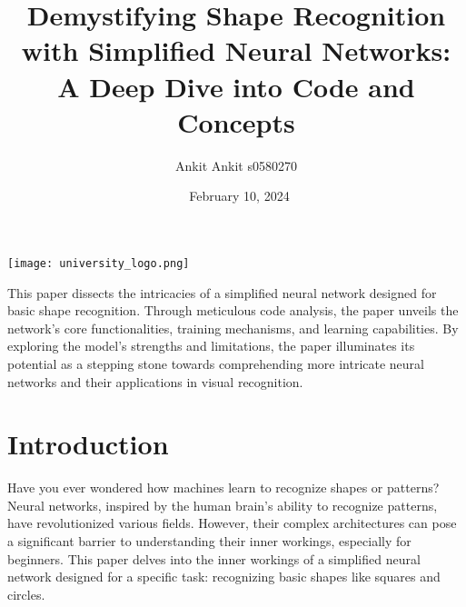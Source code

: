 \documentclass{article}
\renewenvironment{abstract}
 {\small\quotation\noindent\ignorespaces}
 {\endquotation}
\begin{document}
\begin{titlepage}
  \centering
 \vspace*{\fill}
  \texttt{[image: university\_logo.png]}  
 \vspace*{\fill}
  \title{Demystifying Shape Recognition with Simplified Neural Networks: A Deep Dive into Code and Concepts}
  \author{Ankit Ankit s0580270}
  \date{\ February 10, 2024 }
  \maketitle

\begin{abstract}
This paper dissects the intricacies of a simplified neural network designed for basic shape recognition. Through meticulous code analysis, the paper unveils the network's core functionalities, training mechanisms, and learning capabilities. By exploring the model's strengths and limitations, the paper illuminates its potential as a stepping stone towards comprehending more intricate neural networks and their applications in visual recognition.
\end{abstract}
\end{titlepage}
\clearpage

\tableofcontents

\clearpage
\section{Introduction}
Have you ever wondered how machines learn to recognize shapes or patterns? Neural networks, inspired by the human brain's ability to recognize patterns, have revolutionized various fields. However, their complex architectures can pose a significant barrier to understanding their inner workings, especially for beginners. This paper delves into the inner workings of a simplified neural network designed for a specific task: recognizing basic shapes like squares and circles.
\end{document}
